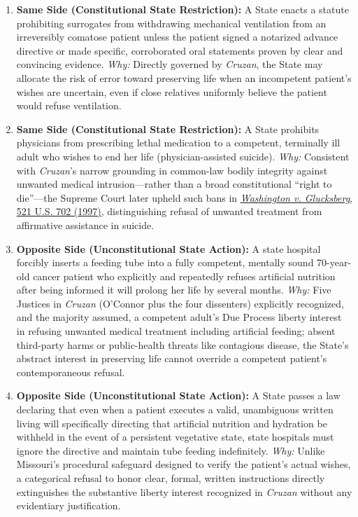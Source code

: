 \documentclass[12pt]{article}
\begin{document}
\begin{enumerate}
  \item \textbf{Same Side (Constitutional State Restriction):} A State enacts a statute prohibiting surrogates from withdrawing mechanical ventilation from an irreversibly comatose patient unless the patient signed a notarized advance directive or made specific, corroborated oral statements proven by clear and convincing evidence. \textit{Why:} Directly governed by \textit{Cruzan}, the State may allocate the risk of error toward preserving life when an incompetent patient's wishes are uncertain, even if close relatives uniformly believe the patient would refuse ventilation.
  \item \textbf{Same Side (Constitutional State Restriction):} A State prohibits physicians from prescribing lethal medication to a competent, terminally ill adult who wishes to end her life (physician-assisted suicide). \textit{Why:} Consistent with \textit{Cruzan}'s narrow grounding in common-law bodily integrity against unwanted medical intrusion---rather than a broad constitutional ``right to die''---the Supreme Court later upheld such bans in \href{https://supreme.justia.com/cases/federal/us/521/702/}{\textit{Washington v. Glucksberg}, 521 U.S. 702 (1997)}, distinguishing refusal of unwanted treatment from affirmative assistance in suicide.
  \item \textbf{Opposite Side (Unconstitutional State Action):} A state hospital forcibly inserts a feeding tube into a fully competent, mentally sound 70-year-old cancer patient who explicitly and repeatedly refuses artificial nutrition after being informed it will prolong her life by several months. \textit{Why:} Five Justices in \textit{Cruzan} (O'Connor plus the four dissenters) explicitly recognized, and the majority assumed, a competent adult's Due Process liberty interest in refusing unwanted medical treatment including artificial feeding; absent third-party harms or public-health threats like contagious disease, the State's abstract interest in preserving life cannot override a competent patient's contemporaneous refusal.
  \item \textbf{Opposite Side (Unconstitutional State Action):} A State passes a law declaring that even when a patient executes a valid, unambiguous written living will specifically directing that artificial nutrition and hydration be withheld in the event of a persistent vegetative state, state hospitals must ignore the directive and maintain tube feeding indefinitely. \textit{Why:} Unlike Missouri's procedural safeguard designed to verify the patient's actual wishes, a categorical refusal to honor clear, formal, written instructions directly extinguishes the substantive liberty interest recognized in \textit{Cruzan} without any evidentiary justification.

\end{enumerate}
\end{document}
